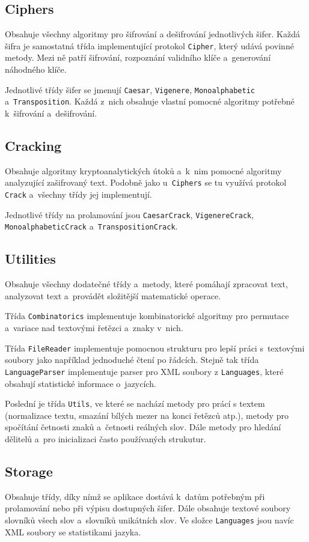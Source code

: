 \documentclass[glossaries, index]{kidiplom}
\begin{document}
\subsection{Ciphers}
Obsahuje všechny algoritmy pro šifrování a dešifrování jednotlivých šifer. Každá šifra je samostatná třída implementující protokol \texttt{Cipher}, který udává povinné metody. Mezi ně patří šifrování, rozpoznání validního klíče a~generování náhodného klíče.

Jednotlivé třídy šifer se jmenují \texttt{Caesar}, \texttt{Vigenere}, \texttt{Monoalphabetic} a~\texttt{Transposition}. Každá z~nich obsahuje vlastní pomocné algoritmy potřebné k~šifrování a~dešifrování.


\subsection{Cracking}
Obsahuje algoritmy kryptoanalytických útoků a~k~nim pomocné algoritmy analyzující zašifrovaný text. Podobně jako u~\texttt{Ciphers} se tu využívá protokol \texttt{Crack} a~všechny třídy jej implementují.

Jednotlivé třídy na prolamování jsou \texttt{CaesarCrack}, \thinspace \texttt{VigenereCrack}, \thinspace\texttt{MonoalphabeticCrack} a~\texttt{TranspositionCrack}. 


\subsection{Utilities}
Obsahuje všechny dodatečné třídy a~metody, které pomáhají zpracovat text, analyzovat text a~provádět složitější matematické operace.

Třída \texttt{Combinatorics} implementuje kombinatorické algoritmy pro permutace a~variace nad textovými řetězci a~znaky v~nich.

Třída \texttt{FileReader} implementuje pomocnou strukturu pro lepší práci s~textovými soubory jako například jednoduché čtení po řádcích. Stejně tak třída \texttt{LanguageParser} implementuje parser pro XML soubory z \texttt{Languages}, které obsahují statistické informace o~jazycích.

Poslední je třída \texttt{Utils}, ve které se nachází metody pro prácí s textem (normalizace textu, smazání bílých mezer na konci řetězců atp.), metody pro spočítání četnosti znaků a~četnosti reálných slov. Dále metody pro hledání dělitelů a~pro inicializaci často používaných strukutur.


\subsection{Storage}
Obsahuje třídy, díky nímž se aplikace dostává k~datům potřebným při prolamování nebo při výpisu dostupných šifer. Dále obsahuje textové soubory slovníků všech slov a~slovníků unikátních slov. Ve složce \texttt{Languages} jsou navíc XML soubory se statistikami jazyka.
\end{document}
